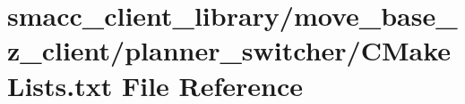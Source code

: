 \hypertarget{smacc__client__library_2move__base__z__client_2planner__switcher_2CMakeLists_8txt}{}\section{smacc\+\_\+client\+\_\+library/move\+\_\+base\+\_\+z\+\_\+client/planner\+\_\+switcher/\+C\+Make\+Lists.txt File Reference}
\label{smacc__client__library_2move__base__z__client_2planner__switcher_2CMakeLists_8txt}

